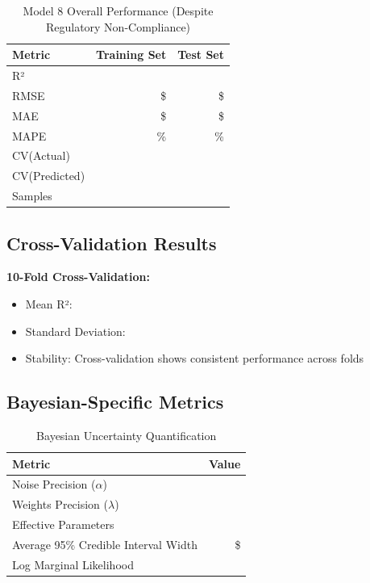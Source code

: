 \begin{table}[h]
\centering
\caption{Model 8 Overall Performance (Despite Regulatory Non-Compliance)}
\begin{tabular}{lrr}
\toprule
\textbf{Metric} & \textbf{Training Set} & \textbf{Test Set} \\
\midrule
R² & \ModelEightRSquaredTrain{} & \ModelEightRSquaredTest{} \\
RMSE & \$\ModelEightRMSETrain{} & \$\ModelEightRMSETest{} \\
MAE & \$\ModelEightMAETrain{} & \$\ModelEightMAETest{} \\
MAPE & \ModelEightMAPETrain{}\% & \ModelEightMAPETest{}\% \\
CV(Actual) & \multicolumn{2}{c}{\ModelEightCVActual{}} \\
CV(Predicted) & \multicolumn{2}{c}{\ModelEightCVPredicted{}} \\
Samples & \ModelEightTrainingSamples{} & \ModelEightTestSamples{} \\
\bottomrule
\end{tabular}
\end{table}

\subsection{Cross-Validation Results}

\textbf{10-Fold Cross-Validation:}
\begin{itemize}
    \item Mean R²: \ModelEightCVMean{}
    \item Standard Deviation: \ModelEightCVStd{}
    \item Stability: Cross-validation shows consistent performance across folds
\end{itemize}

\subsection{Bayesian-Specific Metrics}

\begin{table}[h]
\centering
\caption{Bayesian Uncertainty Quantification}
\begin{tabular}{lr}
\toprule
\textbf{Metric} & \textbf{Value} \\
\midrule
Noise Precision ($\alpha$) & \ModelEightAlpha{} \\
Weights Precision ($\lambda$) & \ModelEightLambda{} \\
Effective Parameters & \ModelEightEffectiveParams{} \\ %
Average 95\% Credible Interval Width & \$\ModelEightAvgCredibleWidth{} \\
Log Marginal Likelihood & \ModelEightLogMarginalLikelihood{} \\
\bottomrule
\end{tabular}
\end{table}

